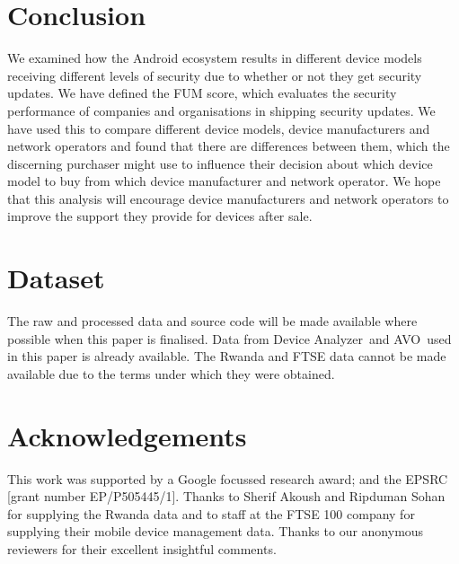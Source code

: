 \documentclass{sig-alternate-2013}
\newcommand{\da}{Device Analyzer}
\newcommand{\avo}{AVO}
\newcommand{\identifying}[1]{#1}%
\begin{document}
\section{Conclusion}
We examined how the Android ecosystem results in different device models receiving different levels of security due to whether or not they get security updates.
We have defined the FUM score, which evaluates the security performance of companies and organisations in shipping security updates.
We have used this to compare different device models, device manufacturers and network operators and found that there are differences between them, which the discerning purchaser might use to influence their decision about which device model to buy from which device manufacturer and network operator.
We hope that this analysis will encourage device manufacturers and network operators to improve the support they provide for devices after sale.

\section*{Dataset}
The raw and processed data and source code will be made available where possible when this paper is finalised.
Data from \da\ and \avo\ used in this paper is already available.
The Rwanda and FTSE data cannot be made available due to the terms under which they were obtained.


\section*{Acknowledgements}
\identifying{
This work was supported by a Google focussed research award; and the EPSRC [grant number EP/P505445/1].
Thanks to Sherif Akoush and Ripduman Sohan for supplying the Rwanda data and to staff at the FTSE 100 company for supplying their mobile device management data.
Thanks to our anonymous reviewers for their excellent insightful comments.
}
\sloppy
\printbibliography
\end{document}

